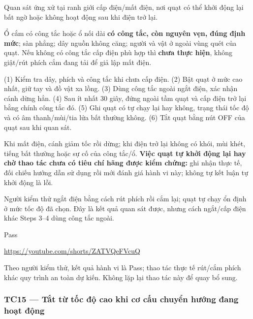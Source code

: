 \begin{description}
\tightlist
\item[Objective]
Quan sát ứng xử tại ranh giới cấp điện/mất điện, nơi quạt có thể khởi động lại bất ngờ hoặc không hoạt động sau khi điện trở lại.
\item[Input]
Ổ cắm có công tắc hoặc ổ nối dài \textbf{có công tắc, còn nguyên vẹn, đúng định mức}; sàn phẳng; dây nguồn không căng; người và vật ở ngoài vùng quét của quạt. Nếu không có công tắc cấp điện phù hợp thì \textbf{chưa thực hiện}, không giật/rút phích cắm đang tải để giả lập mất điện.
\item[Steps]
(1) Kiểm tra dây, phích và công tắc khi chưa cấp điện. (2) Bật quạt ở mức cao nhất, giữ tay và đồ vật xa lồng. (3) Dùng công tắc ngoài ngắt điện, xác nhận cánh dừng hẳn. (4) Sau ít nhất 30 giây, đứng ngoài tầm quạt và cấp điện trở lại bằng chính công tắc đó. (5) Ghi quạt có tự chạy lại hay không, trạng thái tốc độ và có âm thanh/mùi/tia lửa bất thường không. (6) Tắt quạt bằng nút OFF của quạt sau khi quan sát.
\item[Expected]
Khi mất điện, cánh giảm tốc rồi dừng; khi điện trở lại không có khói, mùi khét, tiếng bất thường hoặc sự cố của công tắc/ổ. \textbf{Việc quạt tự khởi động lại hay chờ thao tác chưa có tiêu chí hãng được kiểm chứng:} ghi nhận thực tế, đối chiếu hướng dẫn sử dụng rồi mới đánh giá hành vi này; không tự kết luận tự khởi động là lỗi.
\item[Actual]
Người kiểm thử ngắt điện bằng cách rút phích rồi cắm lại; quạt tự chạy ổn định ở mức tốc độ đã chọn. Đây là kết quả quan sát được, nhưng cách ngắt/cấp điện khác Steps 3--4 dùng công tắc ngoài.
\item[Verdict]
Pass
\item[Bằng chứng]
\url{https://youtube.com/shorts/ZATVQeFVcuQ}
\item[Ghi chú rà soát]
Theo người kiểm thử, kết quả hành vi là Pass; thao tác thực tế rút/cắm phích khác quy trình an toàn dự kiến. Không lặp lại thao tác này để quay bổ sung.
\end{description}

\subsubsection{TC15 --- Tắt từ tốc độ cao khi cơ cấu chuyển hướng đang hoạt động}\label{tc15-tux1eaft-tux1eeb-tux1ed1c-ux111ux1ed9-cao-khi-cux1a1-cux1ea5u-chuyux1ec3n-hux1b0ux1edbng-ux111ang-houx1ea1t-ux111ux1ed9ng}

